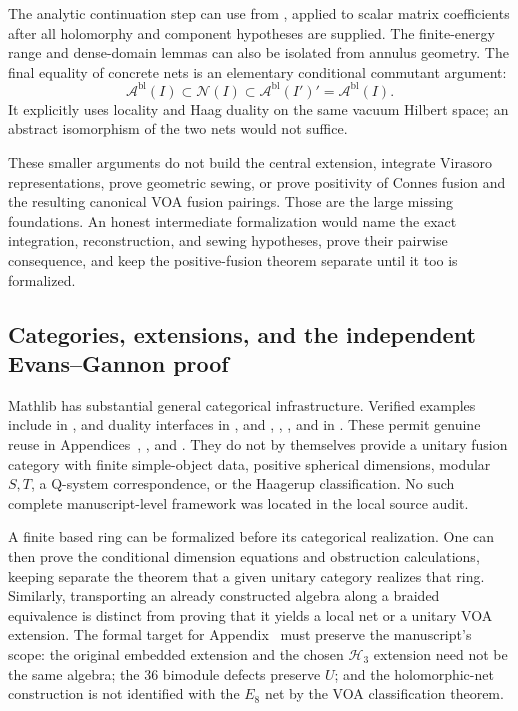 The analytic continuation step can use
 from
, applied to scalar
matrix coefficients after all holomorphy and component hypotheses are
supplied. The finite-energy range and dense-domain lemmas can also be
isolated from annulus geometry. The final equality of concrete nets is
an elementary conditional commutant argument:
\[
 \mathcal A^{\mathrm{bl}}(I)\subset\mathcal N(I)
 \subset\mathcal A^{\mathrm{bl}}(I')'
 =\mathcal A^{\mathrm{bl}}(I).
\]
It explicitly uses locality and Haag duality on the same vacuum Hilbert
space; an abstract isomorphism of the two nets would not suffice.

These smaller arguments do not build the central extension, integrate
Virasoro representations, prove geometric sewing, or prove positivity
of Connes fusion and the resulting canonical VOA fusion pairings.
Those are the large missing foundations. An honest intermediate
formalization would name the exact integration, reconstruction, and
sewing hypotheses, prove their pairwise consequence, and keep the
positive-fusion theorem separate until it too is formalized.

\subsection{Categories, extensions, and the independent Evans--Gannon proof}

Mathlib has substantial general categorical infrastructure. Verified
examples include  in
,
 and duality interfaces in
, and
, ,
, and
 in
.
These permit genuine reuse in Appendices~,
, and . They do not by
themselves provide a unitary fusion category with finite simple-object
data, positive spherical dimensions, modular $S,T$, a Q-system
correspondence, or the Haagerup classification. No such complete
manuscript-level framework was located in the local source audit.

A finite based ring can be formalized before its categorical realization.
One can then prove the conditional dimension equations and obstruction
calculations, keeping separate the theorem that a given unitary
category realizes that ring. Similarly, transporting an already
constructed algebra along a braided equivalence is distinct from
proving that it yields a local net or a unitary VOA extension.
The formal target for Appendix~
must preserve the manuscript's scope:
the original embedded extension and the chosen $\mathcal H_3$
extension need not be the same algebra; the 36 bimodule defects
preserve $U$; and the holomorphic-net construction is not identified
with the $E_8$ net by the VOA classification theorem.

